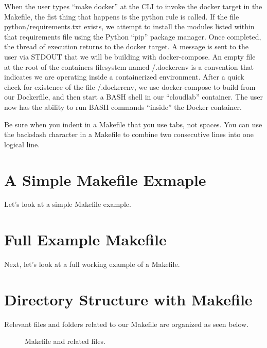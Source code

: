 \justify{}
When the user types ``make docker'' at the CLI to invoke the docker target in the Makefile, the fist thing
that happens is the python rule is called. If the file python/requirements.txt exists, we attempt to install
the modules listed within that requirements file using the Python ``pip'' package manager. Once completed, the
thread of execution returns to the docker target. A message is sent to the user via STDOUT
that we will be building with docker-compose. An empty file at the root of the containers filesystem named /.dockerenv
is a convention that indicates we are operating inside a containerized environment. After a quick check for
existence of the file /.dockerenv, we use docker-compose to build from our Dockerfile, and then start a BASH shell in our ``cloudlab'' container. The user now has the ability to run BASH commands
``inside'' the Docker container.

\justify{}
Be sure when you indent in a Makefile that you use tabs, not spaces. You can use the backslash character in a Makefile to combine two consecutive
lines into one logical line.

\section{A Simple Makefile Exmaple}

\justify{}
Let's look at a simple Makefile example. 

\section{Full Example Makefile}
\justify{}
Next, let's look at a full working example of a Makefile.

\section{Directory Structure with Makefile}
\justify{}
Relevant files and folders related to our Makefile are organized as seen
below.

\begin{figure}[!htb]
	
	\caption{Makefile and related files.}
\label{makefile}
\end{figure}

